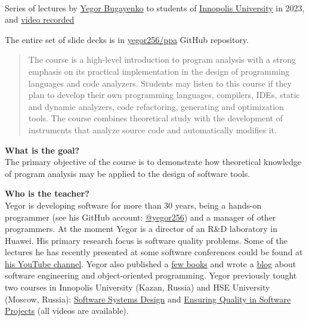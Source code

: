 \documentclass[nobrand,anonymous,nodate,nosecurity]{huawei}
\begin{document}
{\\
Series of lectures by \href{https://www.yegor256.com}{Yegor Bugayenko}
to students of \href{https://innopolis.university/en/}{Innopolis University} in 2023,\\
and \href{https://www.youtube.com/playlist?list=PLaIsQH4uc08wdXIC4utfgMxV_iswE9_Md}{video recorded}}

The entire set of slide decks is in \href{https://github.com/yegor256/ppa}{yegor256/ppa} GitHub repository.

\begin{abstract}
The course is a high-level introduction to program analysis with a
strong emphasis on its practical implementation in the design of programming languages
and code analyzers. Students may listen to this
course if they plan to develop their own programming languages,
compilers, IDEs, static and dynamic analyzers, code refactoring, generating and optimization tools.
The course combines theoretical study with the development of
instruments that analyze source code and automatically modifies it.
\end{abstract}


\textbf{What is the goal?}\\
The primary objective of the course is to demonstrate
how theoretical knowledge of program analysis may be applied to
the design of software tools.

\textbf{Who is the teacher?}\\
Yegor is developing software for more than 30 years, being a hands-on programmer
(see his GitHub account: \href{https://github.com/yegor256}{@yegor256})
and a manager of other programmers. At the moment Yegor is a director
of an R\&D laboratory in Huawei. His primary research focus is
software quality problems. Some of the lectures he has recently presented
at some software conferences could be found at
\href{https://www.youtube.com/channel/UCr9qCdqXLm2SU0BIs6d_68Q}{his YouTube channel}.
Yegor also published a \href{https://www.yegor256.com/books.html}{few books}
and wrote a \href{https://www.yegor256.com/contents.html}{blog} about software engineering
and object-oriented programming.
Yegor previously tought two courses in
Innopolis University (Kazan, Russia)
and HSE University (Moscow, Russia):
\href{https://github.com/yegor256/ssd16}{Software Systems Design}
and
\href{https://github.com/yegor256/eqsp}{Ensuring Quality in Software Projects}
(all videos are available).
\end{document}
